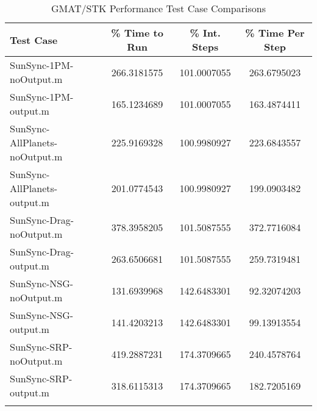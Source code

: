 \begin{table}[htbp!]
\centering
\caption{ GMAT/STK Performance Test Case Comparisons}
      \begin{tabular}{lccc}
      \hline\hline
          Test Case & \% Time to Run & \% Int. Steps & \% Time Per Step \\
         \hline
         SunSync-1PM-noOutput.m & 266.3181575 & 101.0007055 & 263.6795023 \\
         SunSync-1PM-output.m & 165.1234689 & 101.0007055 & 163.4874411 \\
         SunSync-AllPlanets-noOutput.m & 225.9169328 & 100.9980927 & 223.6843557 \\
         SunSync-AllPlanets-output.m & 201.0774543 & 100.9980927 & 199.0903482 \\
         SunSync-Drag-noOutput.m & 378.3958205 & 101.5087555 & 372.7716084 \\
         SunSync-Drag-output.m & 263.6506681 & 101.5087555 & 259.7319481 \\
         SunSync-NSG-noOutput.m & 131.6939968 & 142.6483301 & 92.32074203 \\
         SunSync-NSG-output.m & 141.4203213 & 142.6483301 & 99.13913554 \\
         SunSync-SRP-noOutput.m & 419.2887231 & 174.3709665 & 240.4578764 \\
         SunSync-SRP-output.m & 318.6115313 & 174.3709665 & 182.7205169 \\
      \hline\hline
      \label{Table: Performance3-3} 
\end{tabular}
\end{table}
